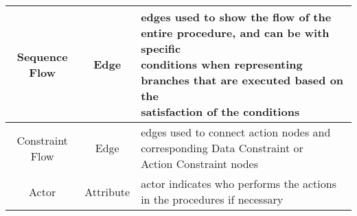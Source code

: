 \begin{table*}[t]
{\begin{tabular}{|c|c|l|}
Sequence Flow   & Edge          & \makecell[l]{edges used to show the flow of the entire procedure, and can be with specific \\ conditions when representing branches that are executed based on the \\ satisfaction of the conditions} \\ \hline
Constraint Flow   & Edge          & \makecell[l]{edges used to connect action nodes and corresponding Data Constraint or \\ Action Constraint nodes}                                                                                     \\ \hline
Actor             & Attribute     & actor indicates who performs the actions in the procedures if necessary                                                                                                             \\ \hline
\end{tabular}
}
\end{table*}
